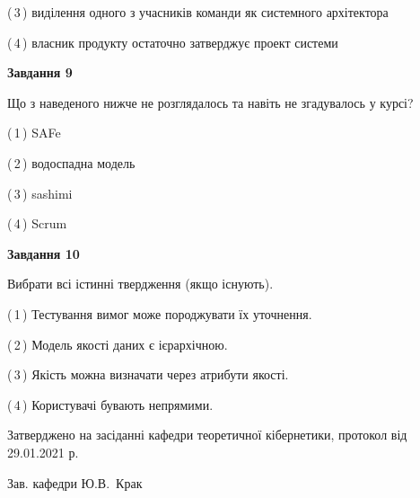 \documentclass[10pt, ukrainian]{article}
\begin{document}
{\begin {large}
(\,3\,) виділення одного з учасників команди як системного архітектора%



(\,4\,) власник продукту остаточно затверджує проект системи%


{\begin {center}\textbf{Завдання 9}\end {center}}\par
Що з наведеного нижче не розглядалось та навіть не згадувалось у курсі?\par
\vspace{2mm}



(\,1\,) SAFe%



(\,2\,) водоспадна модель%



(\,3\,) sashimi%



(\,4\,) Scrum%


{\begin {center}\textbf{Завдання 10}\end {center}}\par
Вибрати всі істинні твердження (якщо існують).\par
\vspace{2mm}



(\,1\,) Тестування вимог може породжувати їх уточнення.%



(\,2\,) Модель якості даних є ієрархічною.%



(\,3\,) Якість можна визначати через атрибути якості.%



(\,4\,) Користувачі бувають непрямими.%



\end {large}}
{\vspace{5mm}\smallskip \begin {small} Затверджено на засіданні кафедри теоретичної кібернетики, протокол  від   29.01.2021 р.\par\smallskip\smallskip
{\parbox {6.5 cm}{Зав. кафедри \dotfill Ю.В.~Крак}} \end{small}}
\newpage
\end{document}
